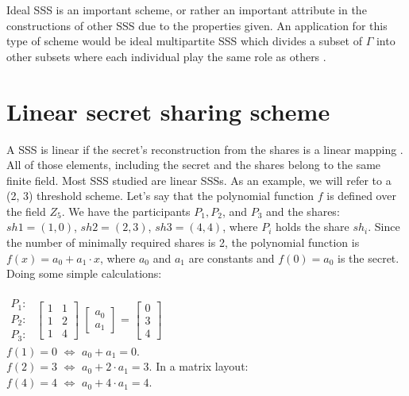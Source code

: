 \documentclass[12pt, a4paper, oneside]{book}
\begin{document}
    Ideal SSS is an important scheme, or rather an important attribute in the constructions of other SSS due to the properties given. An application for this type of scheme would be ideal multipartite SSS which divides a subset of $ \Gamma $ into other subsets where each individual play the same role as others \cite{IdealMultipartite}.
    \section{Linear secret sharing scheme}
    A SSS is linear if the secret's reconstruction from the shares is a linear mapping \cite{SecretSurveyB}. All of those elements, including the secret and the shares belong to the same finite field.
    Most SSS studied are linear SSSs.
    As an example, we will refer to a (2, 3) threshold scheme. Let's say that the polynomial function $f$ is defined over the field $Z_5$. We have the participants $P_1, P_2$, and $P_3$ and the shares: $sh1{=}(1, 0)$, $ sh2{=}(2, 3)$, $sh3{=}(4, 4)$, where $P_i$ holds the share $sh_i$. Since the number of minimally required shares is 2, the polynomial function is $f(x){=}a_0{+}a_1{\cdot}x$, where $a_0$ and $a_1$ are constants and $f(0){=}a_0$ is the secret.
    Doing some simple calculations:
    \\~\\
    {\vspace{-1.5cm}\hspace{8cm}
        $
        \begin{matrix}
        P_1:\\
        P_2:\\
        P_3:
        \end{matrix}
        $
    \vspace{-0,5cm}
        $
        \begin{bmatrix}
        1 & 1\\
        1 & 2\\
        1 & 4
        \end{bmatrix}
        $
        $
        \begin{bmatrix}
        a_0\\
        a_1 
        \end{bmatrix}
        $
        {=}
        $
        \begin{bmatrix}
        0\\
        3\\
        4
        \end{bmatrix}
        $
    }
    \vspace{0.5cm}
    \\
    $f(1){=}0$ ${\Leftrightarrow}$ $a_0+a_1{=}0$.
    \\
    $f(2){=}3$ ${\Leftrightarrow}$ $a_0+2{\cdot}a_1{=}3$. In a matrix layout:
    \\
    $f(4){=}4$ ${\Leftrightarrow}$ $a_0+4{\cdot}a_1{=}4$.
    \\
    
\end{document}
